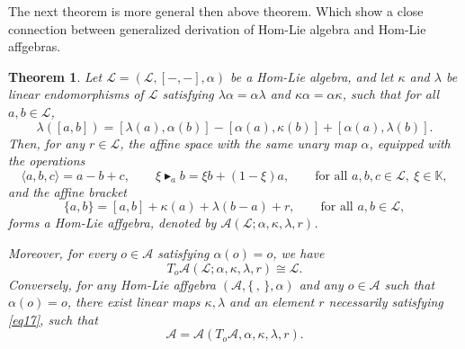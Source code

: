 \documentclass[14pt]{article}
\newtheorem{Thm}[thm]{Theorem}
\theoremstyle{Definition}
\theoremstyle{remark}
\begin{document}
The next theorem is more general then above theorem. Which show a close connection between generalized derivation of Hom-Lie algebra and Hom-Lie affgebras.

\begin{Thm}\label{Thm6.4}
Let $\mathcal{L} = (\mathcal{L}, [-,-], \alpha)$ be a Hom-Lie algebra, and let $\kappa$ and $\lambda$ be linear endomorphisms of $\mathcal{L}$ satisfying $\lambda\alpha = \alpha\lambda$ and $\kappa\alpha = \alpha\kappa$, such that for all $a,b \in \mathcal{L}$,
\begin{equation}\label{eq17}
\lambda([a,b]) = [\lambda(a), \alpha(b)] - [\alpha(a), \kappa(b)] + [\alpha(a), \lambda(b)].
\end{equation}
Then, for any $r \in \mathcal{L}$, the affine space with the same unary map $\alpha$, equipped with the operations
\[
\langle a, b, c \rangle = a - b + c, \qquad 
\xi \blacktriangleright_{a} b = \xi b + (1 - \xi)a, \qquad 
\text{for all } a,b,c \in \mathcal{L},~ \xi \in \mathbb{K},
\]
and the affine bracket
\begin{equation}\label{eq18}
\{a,b\} = [a,b] + \kappa(a) + \lambda(b - a) + r, \qquad \text{for all } a,b \in \mathcal{L},
\end{equation}
forms a Hom-Lie affgebra, denoted by $\mathcal{A}(\mathcal{L}; \alpha, \kappa, \lambda, r)$.

Moreover, for every $o \in \mathcal{A}$ satisfying $\alpha(o) = o$, we have
\[
T_{o}\mathcal{A}(\mathcal{L}; \alpha, \kappa, \lambda, r) \cong \mathcal{L}.
\]
Conversely, for any Hom-Lie affgebra $(\mathcal{A}, \{\, , \,\}, \alpha)$ and any $o \in \mathcal{A}$ such that $\alpha(o) = o$, there exist linear maps $\kappa, \lambda$ and an element $r$ necessarily satisfying \eqref{eq17}, such that
\[
\mathcal{A} = \mathcal{A}(T_{o}\mathcal{A}, \alpha, \kappa, \lambda, r).
\]
\end{Thm}
\end{document}
